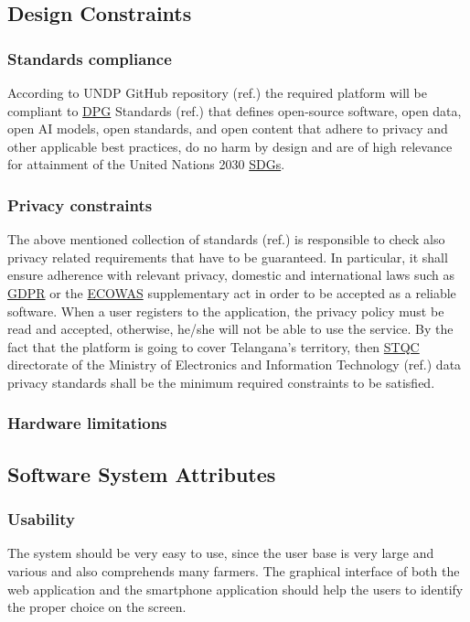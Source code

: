 \subsection{Design Constraints}

\subsubsection{Standards compliance}

According to UNDP GitHub repository (ref.\cite{UNDP_GitHub}) the required platform will be compliant to \hyperref[tab:acronymsTable]{DPG} Standards (ref.\cite{DPGS}) that defines open-source software, open data, open AI models, open standards, and open content that adhere to privacy and other applicable best practices, do no harm by design and are of high relevance for attainment of the United Nations 2030 \hyperref[tab:acronymsTable]{SDGs}.

\subsubsection{Privacy constraints}
The above mentioned collection of standards (ref.\cite{DPGS}) is responsible to check also privacy related requirements that have to be guaranteed. In particular, it shall ensure adherence with relevant privacy, domestic and international laws such as \hyperref[tab:acronymsTable]{GDPR} or the \hyperref[tab:acronymsTable]{ECOWAS} supplementary act  in order to be accepted as a reliable software. When a user registers to the application, the privacy policy must be read and accepted, otherwise, he/she will not be able to use the service. By the fact that the platform is going to cover Telangana's territory, then \hyperref[tab:acronymsTable]{STQC} directorate of the Ministry of Electronics and Information Technology (ref.\cite{DPGS}) data privacy standards shall be the minimum required constraints to be satisfied.




\subsubsection{Hardware limitations}

\subsection{Software System Attributes}
\subsubsection{Usability}
The system should be very easy to use, since the user base is very large and various and also comprehends many farmers. The graphical interface of both the web application and the smartphone application should help the users to identify the proper choice on the screen.
